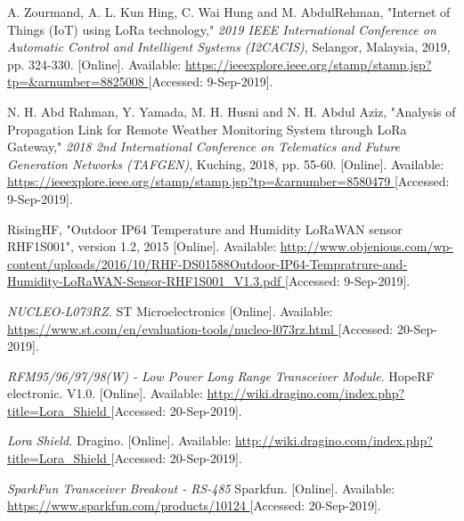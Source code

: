 \begin{thebibliography}{9}
A. Zourmand, A. L. Kun Hing, C. Wai Hung and M. AbdulRehman, "Internet of Things (IoT) using LoRa technology," \textit{2019 IEEE International Conference on Automatic Control and Intelligent Systems (I2CACIS)}, Selangor, Malaysia, 2019, pp. 324-330.
[Online]. Available:
\url{
https://ieeexplore.ieee.org/stamp/stamp.jsp?tp=&arnumber=8825008
}
[Accessed: 9-Sep-2019].


N. H. Abd Rahman, Y. Yamada, M. H. Husni and N. H. Abdul Aziz, "Analysis of Propagation Link for Remote Weather Monitoring System through LoRa Gateway," \textit{2018 2nd International Conference on Telematics and Future Generation Networks (TAFGEN)}, Kuching, 2018, pp. 55-60.
[Online]. Available:
\url{
https://ieeexplore.ieee.org/stamp/stamp.jsp?tp=&arnumber=8580479
}
[Accessed: 9-Sep-2019].




RisingHF, "Outdoor IP64 Temperature and Humidity LoRaWAN sensor RHF1S001", version 1.2, 2015
[Online]. Available:
\url{
http://www.objenious.com/wp-content/uploads/2016/10/RHF-DS01588Outdoor-IP64-Tempratrure-and-Humidity-LoRaWAN-Sensor-RHF1S001_V1.3.pdf
}
[Accessed: 9-Sep-2019].




\textit{
NUCLEO-L073RZ.
}
ST Microelectronics
[Online]. Available:
\url{
https://www.st.com/en/evaluation-tools/nucleo-l073rz.html
}
[Accessed: 20-Sep-2019].



\textit{
RFM95/96/97/98(W) - Low Power Long Range Transceiver Module}.
HopeRF electronic.
V1.0.
[Online]. Available:
\url{
http://wiki.dragino.com/index.php?title=Lora_Shield
}
[Accessed: 20-Sep-2019].



\textit{
Lora Shield.
}
Dragino.
[Online]. Available:
\url{
http://wiki.dragino.com/index.php?title=Lora_Shield
}
[Accessed: 20-Sep-2019].



\textit{
SparkFun Transceiver Breakout - RS-485
}
Sparkfun.
[Online]. Available:
\url{
https://www.sparkfun.com/products/10124
}
[Accessed: 20-Sep-2019].



\end{thebibliography}

